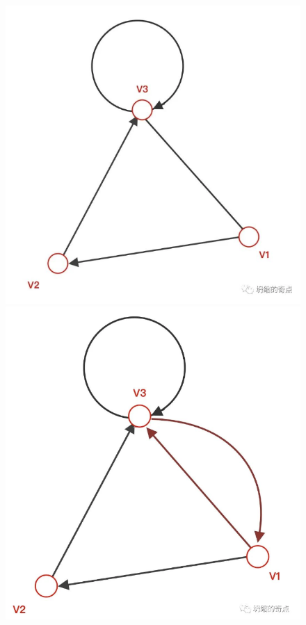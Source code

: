 \begin{figure}[ht]
  \centering
  \begin{minipage}[h]{0.4\textwidth}
    \includegraphics[width=\textwidth]{asset/20231227145210.png}
  \end{minipage}%
  \hspace{1em}
  \begin{minipage}[h]{0.4\textwidth}
      \includegraphics[width=\textwidth]{asset/20231227145222.png}
  \end{minipage}
  \caption{}
  \label{fig:img25_8}
\end{figure}

